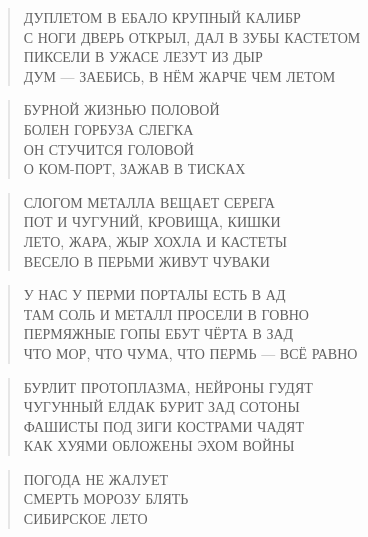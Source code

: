 \poemtitle{***}
\begin{verse}
ДУПЛЕТОМ В ЕБАЛО КРУПНЫЙ КАЛИБР\\
С НОГИ ДВЕРЬ ОТКРЫЛ, ДАЛ В ЗУБЫ КАСТЕТОМ\\
ПИКСЕЛИ В УЖАСЕ ЛЕЗУТ ИЗ ДЫР\\
ДУМ — ЗАЕБИСЬ, В НЁМ ЖАРЧЕ ЧЕМ ЛЕТОМ
\end{verse}

\poemtitle{***}
\begin{verse}
БУРНОЙ ЖИЗНЬЮ ПОЛОВОЙ\\
БОЛЕН ГОРБУЗА СЛЕГКА\\
ОН СТУЧИТСЯ ГОЛОВОЙ\\
О КОМ-ПОРТ, ЗАЖАВ В ТИСКАХ
\end{verse}

\poemtitle{***}
\begin{verse}
СЛОГОМ МЕТАЛЛА ВЕЩАЕТ СЕРЕГА\\
ПОТ И ЧУГУНИЙ, КРОВИЩА, КИШКИ\\
ЛЕТО, ЖАРА, ЖЫР ХОХЛА И КАСТЕТЫ\\
ВЕСЕЛО В ПЕРЬМИ ЖИВУТ ЧУВАКИ
\end{verse}

\poemtitle{***}
\begin{verse}
У НАС У ПЕРМИ ПОРТАЛЫ ЕСТЬ В АД\\
ТАМ СОЛЬ И МЕТАЛЛ ПРОСЕЛИ В ГОВНО\\
ПЕРМЯЖНЫЕ ГОПЫ ЕБУТ ЧЁРТА В ЗАД\\
ЧТО МОР, ЧТО ЧУМА, ЧТО ПЕРМЬ — ВСЁ РАВНО
\end{verse}

\poemtitle{***}
\begin{verse}
БУРЛИТ ПРОТОПЛАЗМА, НЕЙРОНЫ ГУДЯТ\\
ЧУГУННЫЙ ЕЛДАК БУРИТ ЗАД СОТОНЫ\\
ФАШИСТЫ ПОД ЗИГИ КОСТРАМИ ЧАДЯТ\\
КАК ХУЯМИ ОБЛОЖЕНЫ ЭХОМ ВОЙНЫ
\end{verse}

\poemtitle{***}
\begin{verse}
ПОГОДА НЕ ЖАЛУЕТ\\
СМЕРТЬ МОРОЗУ БЛЯТЬ\\
СИБИРСКОЕ ЛЕТО
\end{verse}

